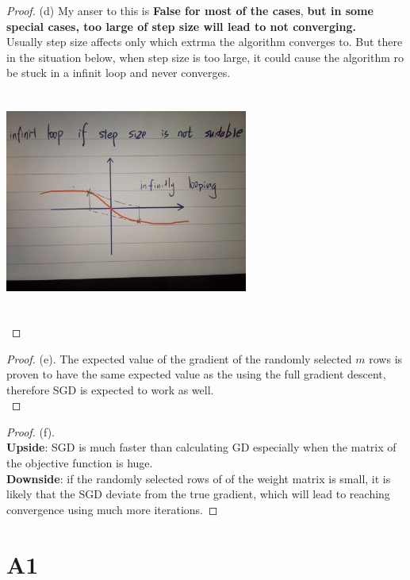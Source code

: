 \documentclass[12pt]{article}
\begin{document}
\begin{proof}
        (d) My anser to this is \textbf{False for most of the cases}, \textbf{but in some special cases, too large of step size will lead to not converging.}\\ Usually step size affects only which extrma the algorithm converges to. But there in the situation below, when step size is too large, it could cause the algorithm ro be stuck in a infinit loop and never converges.\\ 
        \includegraphics[width = 8cm, height = 8cm]{../code/A0_step.jpg}\\ 

\end{proof}

\begin{proof}
        (e). The expected value of the gradient of the randomly selected $m$ rows is proven to have the same expected value as the using the full gradient descent, therefore SGD is expected to work as well.\\
\end{proof}

\begin{proof}
        (f).\\
        \textbf{Upside}: SGD is much faster than calculating GD especially when the matrix of the objective function is huge.  \\
        \textbf{Downside}: if the randomly selected rows of of the weight matrix is small, it is likely that the SGD deviate from the true gradient, which will lead to reaching convergence using much more iterations.
\end{proof}
\newpage
\section*{A1}
\end{document}
